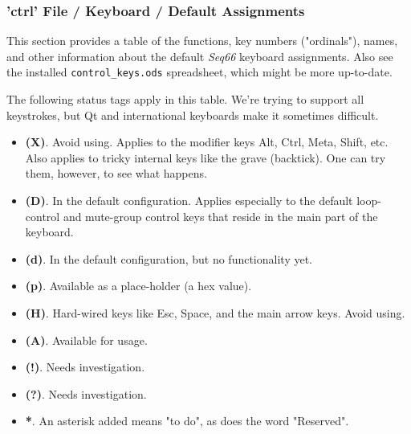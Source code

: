 %
%
%

\subsubsection{'ctrl' File / Keyboard / Default Assignments}
\label{subsubsec:ctrl_keyboard_default_assignments}

   This section provides a table of the functions, key numbers ("ordinals"),
   names, and other information about the default \textsl{Seq66}
   keyboard assignments.
   Also see the installed \texttt{control\_keys.ods} spreadsheet, which
   might be more up-to-date.

   The following status tags apply in this table.
   We're trying to support all keystrokes, but Qt and international keyboards
   make it sometimes difficult.

   \begin{itemize}
      \item \textbf{(X)}.
         Avoid using.  Applies to the modifier keys Alt, Ctrl, Meta, Shift, etc.
         Also applies to tricky internal keys like the grave (backtick).
         One can try them, however, to see what happens.
      \item \textbf{(D)}.
         In the default configuration. Applies especially to the default
         loop-control and mute-group control keys that reside in the main part of
         the keyboard.
      \item \textbf{(d)}.
         In the default configuration, but no functionality yet.
      \item \textbf{(p)}.
         Available as a place-holder (a hex value).
      \item \textbf{(H)}.
         Hard-wired keys like Esc, Space, and the main arrow keys.  Avoid using.
      \item \textbf{(A)}.
         Available for usage.
      \item \textbf{(!)}.
         Needs investigation.
      \item \textbf{(?)}.
         Needs investigation.
      \item \textbf{*}. An asterisk added means "to do", as does the word
         "Reserved".
   \end{itemize}

